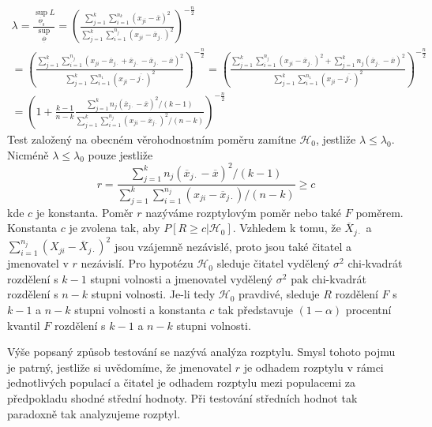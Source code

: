 \begin{multline*}
\lambda = \frac{\sup_{\overline{\underline{\Theta}}_0} L}{\sup_{\overline{\underline{\Theta}}}} = \left(\frac{\sum_{j = 1}^k \sum_{i = 1}^{n_k}(x_{ji} - \overline{x})^2}{\sum_{j = 1}^k \sum_{i = 1}^{n_j}(x_{ji} - \overline{x}_{j \cdot})^2}\right)^{-\frac{n}{2}}\\
= \left(\frac{\sum_{j = 1}^k \sum_{i = 1}^{n_j}(x_{ji} - \overline{x}_{j \cdot} + \overline{x}_{j \cdot} - \overline{x}_{j \cdot} - \overline{x})^2}{\sum_{j = 1}^k \sum_{i = 1}^{n_1} (x_{ji} - \overline{j \cdot})^2}\right)^{-\frac{n}{2}}
= \left(\frac{\sum_{j = 1}^k \sum_{i = 1}^{n_j}(x_{ji} - \overline{x}_{j \cdot})^2 + \sum_{j = 1}^k n_j (\overline{x}_{j \cdot} - \overline{x})^2}{\sum_{j = 1}^k \sum_{i = 1}^{n_1} (x_{ji} - \overline{j \cdot})^2}\right)^{-\frac{n}{2}}\\
= \left(1 + \frac{k - 1}{n - k}\frac{\sum_{j = 1}^k n_j(\overline{x}_{j \cdot} - \overline{x})^2/(k - 1)}{\sum_{j = 1}^k \sum_{i = 1}^{n_j}(x_{ji} - \overline{x}_{j \cdot})^2 / (n - k)}\right)^{-\frac{n}{2}}
\end{multline*}
Test založený na obecném věrohodnostním poměru zamítne $\mathscr{H}_0$, jestliže $\lambda \le \lambda_0$. Nicméně $\lambda \le \lambda_0$ pouze jestliže
\begin{equation*}
r = \frac{\sum_{j = 1}^k n_j (\overline{x}_{j \cdot} - \overline{x})^2 / (k - 1)}{\sum_{j = 1}^k \sum_{i = 1}^{n_j}(x_{ji} - \overline{x}_{j \cdot}) / (n - k)} \ge c
\end{equation*}
kde $c$ je konstanta. Poměr $r$ nazýváme rozptylovým poměr nebo také $F$ poměrem. Konstanta $c$ je zvolena tak, aby $P[R \ge c | \mathscr{H}_0]$. Vzhledem k tomu, že $\overline{X}_{j \cdot}$ a $\sum_{i = 1}^{n_j}(X_{ji} - \overline{X}_{j \cdot})^2$ jsou vzájemně nezávislé, proto jsou také čitatel a jmenovatel v $r$ nezávislí. Pro hypotézu $\mathscr{H}_0$ sleduje čitatel vydělený $\sigma^2$ chi-kvadrát rozdělení s $k - 1$ stupni volnosti a jmenovatel vydělený $\sigma^2$ pak chi-kvadrát rozdělení s $n - k$ stupni volnosti. Je-li tedy $\mathscr{H}_0$ pravdivé, sleduje $R$ rozdělení $F$ s $k - 1$ a $n - k$ stupni volnosti a konstanta $c$ tak představuje $(1 - \alpha)$ procentní kvantil $F$ rozdělení s  $k - 1$ a $n - k$ stupni volnosti.

Výše popsaný způsob testování se nazývá analýza rozptylu. Smysl tohoto pojmu je patrný, jestliže si uvědomíme, že jmenovatel $r$ je odhadem rozptylu v rámci jednotlivých populací a čitatel je odhadem rozptylu mezi populacemi za předpokladu shodné střední hodnoty. Při testování středních hodnot tak paradoxně tak analyzujeme rozptyl.


